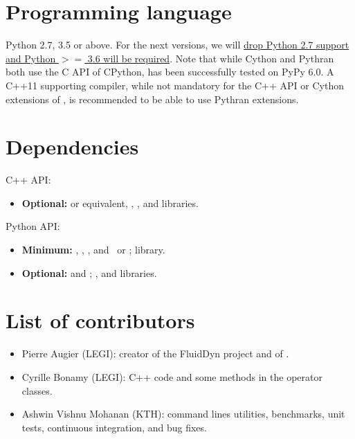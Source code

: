 \section{Programming language}


Python 2.7, 3.5 or above. For the next versions, we will
\href{https://python3statement.org/}{drop Python 2.7 support and Python $>=$
3.6 will be required}.
%
Note that while Cython and Pythran both use the C API of CPython, 
has been successfully tested on PyPy 6.0.
%
A C++11 supporting compiler, while not mandatory for the C++ API or Cython
extensions of , is recommended to be able to use Pythran extensions.

\section{Dependencies}

C++ API:
\begin{itemize}
  \item{\bf Optional:}  or equivalent, ,
    ,  and  libraries.
\end{itemize}

Python API:

\begin{itemize}
\item {\bf Minimum:} , , , and
  \ or ;  library.
\item {\bf Optional:}  and ; ,
   and  libraries.
\end{itemize}


\section{List of contributors}


\begin{itemize}
\item Pierre Augier (LEGI): creator of the FluidDyn project and of
.
\item Cyrille Bonamy (LEGI): C++ code and some methods in the operator classes.
\item Ashwin Vishnu Mohanan (KTH): command lines utilities, benchmarks, unit
  tests, continuous integration, and bug fixes.
\end{itemize}

